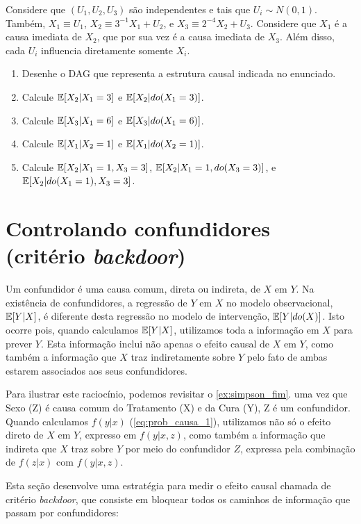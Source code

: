 \begin{exercise}
 Considere que $(U_1, U_2, U_3)$ são independentes e
 tais que $U_i \sim N(0,1)$. Também,
 $X_1 \equiv U_1$,
 $X_2 \equiv 3^{-1}X_1 + U_2$, e
 $X_3 \equiv 2^{-4}X_2 + U_3$.
 Considere que $X_1$ é 
 a causa imediata de $X_2$,
 que por sua vez é a causa imediata de $X_3$.
 Além disso, cada $U_i$ influencia diretamente somente $X_i$.
 \begin{enumerate}[label=(\alph*)]
  \item Desenhe o DAG que representa 
  a estrutura causal indicada no enunciado. 
  \item Calcule ${\mathbb E}[X_2|X_1 = 3]$ e ${\mathbb E}[X_2|do(X_1 = 3)]$.
  \item Calcule ${\mathbb E}[X_3|X_1 = 6]$ e ${\mathbb E}[X_3|do(X_1 = 6)]$.
  \item Calcule ${\mathbb E}[X_1|X_2 = 1]$ e ${\mathbb E}[X_1|do(X_2 = 1)]$.
  \item Calcule ${\mathbb E}[X_2|X_1 = 1, X_3 = 3]$,
  ${\mathbb E}[X_2|X_1 = 1, do(X_3 = 3)]$, e
  ${\mathbb E}[X_2|do(X_1 = 1), X_3 = 3]$.
 \end{enumerate}
\end{exercise}

\section{Controlando confundidores (critério \textit{backdoor})}
\label{sec:backdoor}

Um confundidor é uma causa comum, 
direta ou indireta, de $X$ em $Y$.
Na existência de confundidores,
a regressão de $Y$ em $X$ no modelo observacional, 
${\mathbb E}[Y|X]$, é diferente desta regressão
no modelo de intervenção, ${\mathbb E}[Y|do(X)]$.
Isto ocorre pois, quando calculamos ${\mathbb E}[Y|X]$,
utilizamos toda a informação em $X$ para prever $Y$.
Esta informação inclui não apenas 
o efeito causal de $X$ em $Y$, como 
também a informação que $X$ traz indiretamente sobre $Y$ 
pelo fato de ambas estarem associados aos seus confundidores.

Para ilustrar este raciocínio, 
podemos revisitar o \cref{ex:simpson_fim}.
uma vez que Sexo (Z) é causa comum do Tratamento (X) e
da Cura (Y), Z é um confundidor.
Quando calculamos $f(y|x)$ (\cref{eq:prob_causa_1}), 
utilizamos não só o efeito direto de $X$ em $Y$, 
expresso em $f(y|x,z)$, como também 
a informação que indireta que $X$ traz sobre $Y$
por meio do confundidor $Z$,
expressa pela combinação de $f(z|x)$ com $f(y|x,z)$.

Esta seção desenvolve uma estratégia para
medir o efeito causal chamada de 
critério \textit{backdoor}, que
consiste em bloquear 
todos os caminhos de informação que passam por confundidores:

